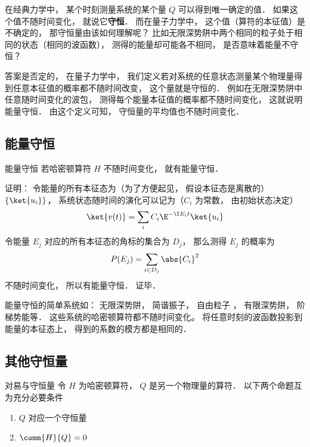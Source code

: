 

在经典力学中， 某个时刻测量系统的某个量 $Q$ 可以得到唯一确定的值． 如果这个值不随时间变化， 就说它\textbf{守恒}． 而在量子力学中， 这个值（算符的本征值）是不确定的， 那守恒量由该如何理解呢？ 比如无限深势阱中两个相同的粒子处于相同的状态（相同的波函数）， 测得的能量却可能各不相同， 是否意味着能量不守恒？

答案是否定的， 在量子力学中， 我们定义若对系统的任意状态测量某个物理量得到任意本征值的概率都不随时间改变， 这个量就是守恒的． 例如在无限深势阱中任意随时间变化的波包， 测得每个能量本征值的概率都不随时间变化， 这就说明能量守恒． 由这个定义可知， 守恒量的平均值也不随时间变化．

\subsection{能量守恒}

\begin{theorem}{能量守恒}
若哈密顿算符 $H$ 不随时间变化， 就有能量守恒．
\end{theorem}
证明： 令能量的所有本征态为（为了方便起见， 假设本征态是离散的） $\{\ket{u_i}\}$， 系统状态随时间的演化可以记为（$C_i$ 为常数， 由初始状态决定）
\begin{equation}
\ket{v(t)} = \sum_i C_i \E^{-\I E_i t} \ket{u_i}
\end{equation}
令能量 $E_j$ 对应的所有本征态的角标的集合为 $D_j$， 那么测得 $E_j$ 的概率为
\begin{equation}
P(E_j) = \sum_{i \in D_j} \abs{C_i}^2
\end{equation}
不随时间变化， 所以有能量守恒． 证毕．

\begin{example}{}
能量守恒的简单系统如： 无限深势阱， 简谐振子， 自由粒子%
， 有限深势阱， 阶梯势能等． 这些系统的哈密顿算符都不随时间变化。 将任意时刻的波函数投影到能量的本征态上， 得到的系数的模方都是相同的．
\end{example}

\subsection{其他守恒量}


\begin{theorem}{对易与守恒量}
令 $H$ 为哈密顿算符， $Q$ 是另一个物理量的算符． 以下两个命题互为充分必要条件
\begin{enumerate}
\item $Q$ 对应一个守恒量
\item $\comm{H}{Q} = 0$
\end{enumerate}
\end{theorem}

